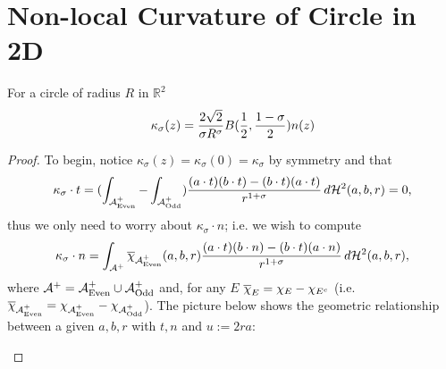 \documentclass{article}
\newcommand{\haus}[2]{\mathcal{H}^{#1}\parens{#2}}
\newcommand{\R}[1]{\mathbb{R}^{#1}}
\newcommand{\optparens}[1]{\ifthenelse{\equal{#1}{}}{}{\parens{#1}}}
\newcommand{\chit}[2]{\overline{\chi}_{#1}\optparens{#2}}
\newcommand{\A}{\mathcal{A}^{+}}
\newcommand{\Ae}{\A_{\textup{Even}}}
\newcommand{\Ao}{\A_{\textup{Odd}}}
\newcommand{\ks}{\kappa_\sigma}
\newcommand{\B}[1]{B\parens{#1}}
\renewcommand{\dot}[2]{{#1}\cdot{#2}}
\newcommand{\pdot}[2]{\parens{\dot{#1}{#2}}}
\begin{document}
\section{Non-local Curvature of Circle in 2D}%
\begin{theorem}
For a circle of radius $R$ in $\R{2}$
$$
  \ks(z) = \frac{2\sqrt{2}}{\sigma R^\sigma} \B{\frac{1}{2}, \frac{1-\sigma}{2}} n(z)
$$
\end{theorem}
\begin{proof}
  To begin, notice $\ks(z) = \ks(0) = \ks$ by symmetry and that
  $$
  \dot{\ks}{t} = \parens{\int_{\Ae} - \int_{\Ao}} \frac{\pdot{a}{t}\pdot{b}{t} - \pdot{b}{t}\pdot{a}{t}}{r^{1+\sigma}} \, d\haus{2}{a,b,r} = 0,
  $$
  thus we only need to worry about $\dot{\ks}{n}$; i.e. we wish to compute
  $$
  \dot{\ks}{n} = \int_{\A} \chit{\Ae}{a, b, r} \frac{\pdot{a}{t}\pdot{b}{n} - \pdot{b}{t}\pdot{a}{n}}{r^{1+\sigma}} \, d\haus{2}{a,b,r},
  $$
  where $\A = \Ae \cup \Ao$ and, for any $E$ $\chit{E}{} = \chi_{E} - \chi_{E^c}$ (i.e. $\chit{\Ae}{} = \chi_{\Ae} - \chi_{\Ao}$). The picture below shows the geometric relationship between a given $a, b, r$ with $t, n$ and $u := 2ra$:

\begin{center}
\end{center}
\end{proof}
\end{document}
